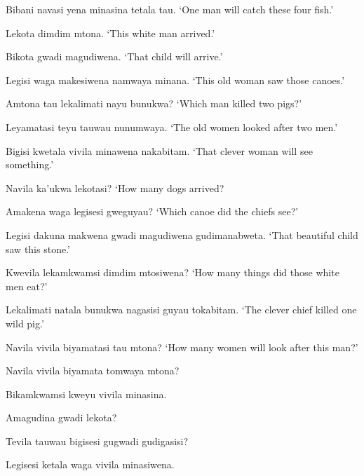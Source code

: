 \documentclass{article}
\def\\{}%
\begin{document}
\begin{exe}

\ex\label{ex:1} Bibani navasi yena minasina tetala tau. \\
`One man will catch these four fish.'

\ex\label{ex:2} Lekota dimdim mtona. \\
`This white man arrived.'

\ex\label{ex:3} Bikota gwadi magudiwena. \\
`That child will arrive.'

\ex\label{ex:4} Legisi waga makesiwena namwaya minana. \\
`This old woman saw those canoes.'

\ex\label{ex:5} Amtona tau lekalimati nayu bunukwa? \\
`Which man killed two pigs?'

\ex\label{ex:6} Leyamatasi teyu tauwau nunumwaya. \\
`The old women looked after two men.'

\ex\label{ex:7} Bigisi kwetala vivila minawena nakabitam. \\
`That clever woman will see something.'

\ex\label{ex:8} Navila ka’ukwa lekotasi? \\
`How many dogs arrived?

\ex\label{ex:9} Amakena waga legisesi gweguyau? \\
`Which canoe did the chiefs see?'

\ex\label{ex:10} Legisi dakuna makwena gwadi magudiwena gudimanabweta. \\
`That beautiful child saw this stone.'

\ex\label{ex:11} Kwevila lekamkwamsi dimdim mtosiwena? \\
`How many things did those white men eat?'

\ex\label{ex:12} Lekalimati natala bunukwa nagasisi guyau tokabitam. \\
`The clever chief killed one wild pig.'

\ex\label{ex:13} Navila vivila biyamatasi tau mtona? \\
`How many women will look after this man?'

\ex\label{ex:14}  Navila vivila biyamata tomwaya mtona?

\ex\label{ex:15} Bikamkwamsi kweyu vivila minasina.

\ex\label{ex:16} Amagudina gwadi lekota?

\ex\label{ex:17} Tevila tauwau bigisesi gugwadi gudigasisi?

\ex\label{ex:18} Legisesi ketala waga vivila minasiwena.

\end{exe}
\end{document}
